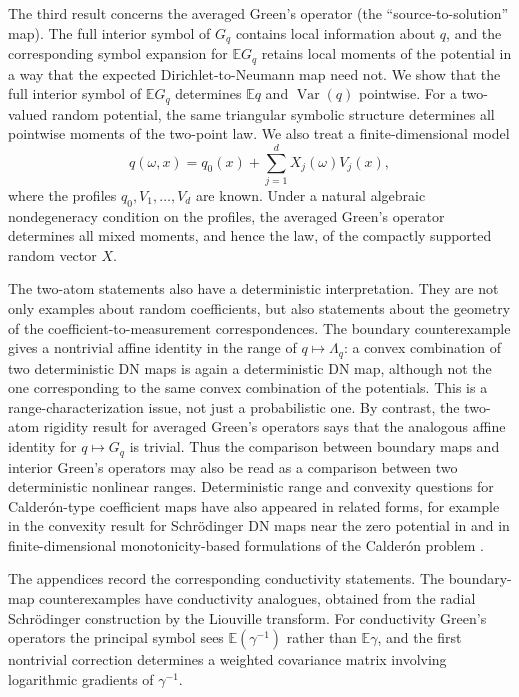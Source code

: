 \documentclass[11pt]{article}
\newcommand{\E}{\mathbb E}
\newcommand{\Var}{\operatorname{Var}}
\theoremstyle{plain}
\theoremstyle{definition}
\theoremstyle{remark}
\begin{document}
The third result concerns the averaged Green's operator (the ``source-to-solution'' map).  The full interior symbol of $G_q$ contains local information about $q$, and the corresponding symbol expansion for $\E G_q$ retains local moments of the potential in a way that the expected Dirichlet-to-Neumann map need not.  We show that the full interior symbol of $\E G_q$ determines $\E q$ and $\Var(q)$ pointwise.  For a two-valued random potential, the same triangular symbolic structure determines all pointwise moments of the two-point law.  We also treat a finite-dimensional model
\[
  q(\omega,x)=q_0(x)+\sum_{j=1}^d X_j(\omega)V_j(x),
\]
where the profiles $q_0,V_1,\ldots,V_d$ are known.  Under a natural algebraic nondegeneracy condition on the profiles, the averaged Green's operator determines all mixed moments, and hence the law, of the compactly supported random vector $X$.

The two-atom statements also have a deterministic interpretation.  They are not only examples about random coefficients, but also statements about the geometry of the coefficient-to-measurement correspondences.  The boundary counterexample gives a nontrivial affine identity in the range of $q\mapsto\Lambda_q$: a convex combination of two deterministic DN maps is again a deterministic DN map, although not the one corresponding to the same convex combination of the potentials.  This is a range-characterization issue, not just a probabilistic one.  By contrast, the two-atom rigidity result for averaged Green's operators says that the analogous affine identity for $q\mapsto G_q$ is trivial.  Thus the comparison between boundary maps and interior Green's operators may also be read as a comparison between two deterministic nonlinear ranges.  Deterministic range and convexity questions for Calder\'on-type coefficient maps have also appeared in related forms, for example in the convexity result for Schr\"odinger DN maps near the zero potential in \cite{CarsteaFeizmohammadiOksanen2023} and in finite-dimensional monotonicity-based formulations of the Calder\'on problem \cite{Harrach2023}.

The appendices record the corresponding conductivity statements.  The boundary-map counterexamples have conductivity analogues, obtained from the radial Schr\"odinger construction by the Liouville transform.  For conductivity Green's operators the principal symbol sees $\E(\gamma^{-1})$ rather than $\E\gamma$, and the first nontrivial correction determines a weighted covariance matrix involving logarithmic gradients of $\gamma^{-1}$.
\end{document}
